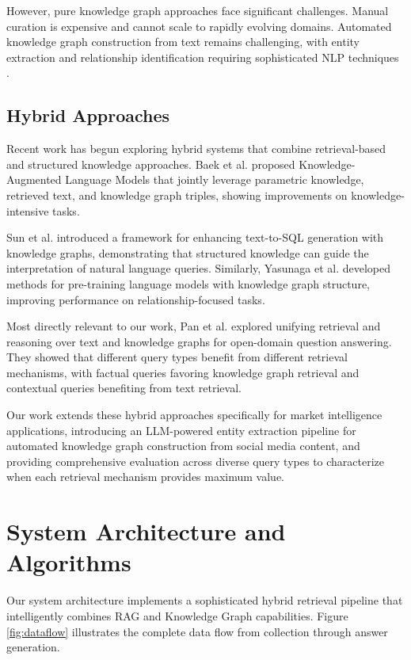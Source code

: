 \documentclass[11pt,twocolumn]{article}
\begin{document}
However, pure knowledge graph approaches face significant challenges. Manual curation is expensive and cannot scale to rapidly evolving domains. Automated knowledge graph construction from text remains challenging, with entity extraction and relationship identification requiring sophisticated NLP techniques \cite{rosso2022entity}.

\subsection{Hybrid Approaches}

Recent work has begun exploring hybrid systems that combine retrieval-based and structured knowledge approaches. Baek et al. \cite{baek2023knowledge} proposed Knowledge-Augmented Language Models that jointly leverage parametric knowledge, retrieved text, and knowledge graph triples, showing improvements on knowledge-intensive tasks.

Sun et al. \cite{sun2023text} introduced a framework for enhancing text-to-SQL generation with knowledge graphs, demonstrating that structured knowledge can guide the interpretation of natural language queries. Similarly, Yasunaga et al. \cite{yasunaga2022linkbert} developed methods for pre-training language models with knowledge graph structure, improving performance on relationship-focused tasks.

Most directly relevant to our work, Pan et al. \cite{pan2023unifying} explored unifying retrieval and reasoning over text and knowledge graphs for open-domain question answering. They showed that different query types benefit from different retrieval mechanisms, with factual queries favoring knowledge graph retrieval and contextual queries benefiting from text retrieval.

Our work extends these hybrid approaches specifically for market intelligence applications, introducing an LLM-powered entity extraction pipeline for automated knowledge graph construction from social media content, and providing comprehensive evaluation across diverse query types to characterize when each retrieval mechanism provides maximum value.

\section{System Architecture and Algorithms}

Our system architecture implements a sophisticated hybrid retrieval pipeline that intelligently combines RAG and Knowledge Graph capabilities. Figure \ref{fig:dataflow} illustrates the complete data flow from collection through answer generation.
\end{document}

